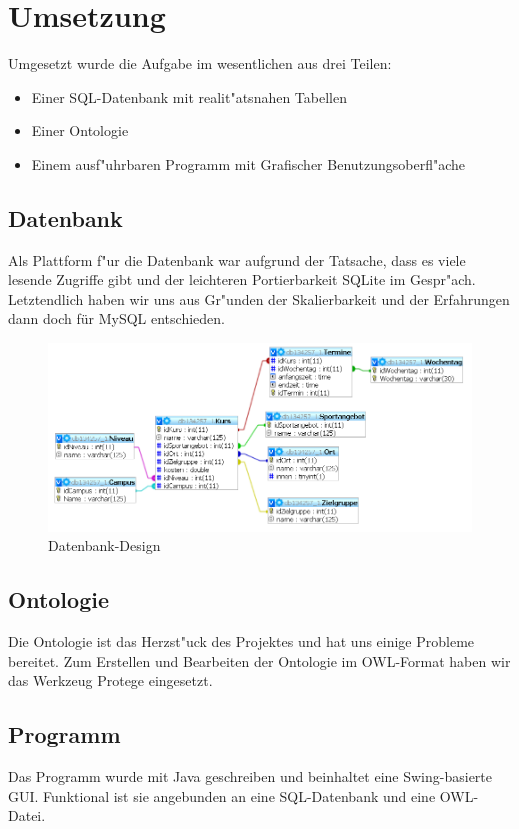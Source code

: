 \chapter{Umsetzung}

Umgesetzt wurde die Aufgabe im wesentlichen aus drei Teilen: 
\begin{itemize}
	\item Einer SQL-Datenbank mit realit"atsnahen Tabellen 
	\item Einer Ontologie 
	\item Einem ausf"uhrbaren Programm mit Grafischer Benutzungsoberfl"ache

\end{itemize}

\section{Datenbank}

Als Plattform f"ur die Datenbank war aufgrund der Tatsache, dass es viele lesende Zugriffe gibt und der leichteren Portierbarkeit SQLite im Gespr"ach. Letztendlich haben wir uns aus Gr"unden der Skalierbarkeit und der Erfahrungen dann doch für MySQL entschieden.



\begin{figure}%
\includegraphics[width=150mm]{images/db_design}
\caption{Datenbank-Design}%
\label{dbd}%
\end{figure}



\section{Ontologie}
Die Ontologie ist das Herzst"uck des Projektes und hat uns einige Probleme bereitet. Zum Erstellen und Bearbeiten der Ontologie im OWL-Format haben wir das Werkzeug Protege eingesetzt.


\section{Programm}
Das Programm wurde mit Java geschreiben und beinhaltet eine Swing-basierte GUI. Funktional ist sie angebunden an eine SQL-Datenbank und eine OWL-Datei.


